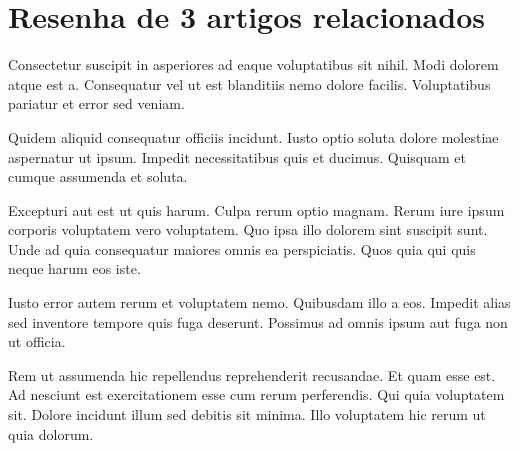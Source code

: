 
\chapter{Resenha de 3 artigos relacionados}

Consectetur suscipit in asperiores ad eaque voluptatibus sit nihil. Modi dolorem atque est a. Consequatur vel ut est blanditiis nemo dolore facilis. Voluptatibus pariatur et error sed veniam.

Quidem aliquid consequatur officiis incidunt. Iusto optio soluta dolore molestiae aspernatur ut ipsum. Impedit necessitatibus quis et ducimus. Quisquam et cumque assumenda et soluta.

Excepturi aut est ut quis harum. Culpa rerum optio magnam. Rerum iure ipsum corporis voluptatem vero voluptatem. Quo ipsa illo dolorem sint suscipit sunt. Unde ad quia consequatur maiores omnis ea perspiciatis. Quos quia qui quis neque harum eos iste.

Iusto error autem rerum et voluptatem nemo. Quibusdam illo a eos. Impedit alias sed inventore tempore quis fuga deserunt. Possimus ad omnis ipsum aut fuga non ut officia.

Rem ut assumenda hic repellendus reprehenderit recusandae. Et quam esse est. Ad nesciunt est exercitationem esse cum rerum perferendis. Qui quia voluptatem sit. Dolore incidunt illum sed debitis sit minima. Illo voluptatem hic rerum ut quia dolorum.